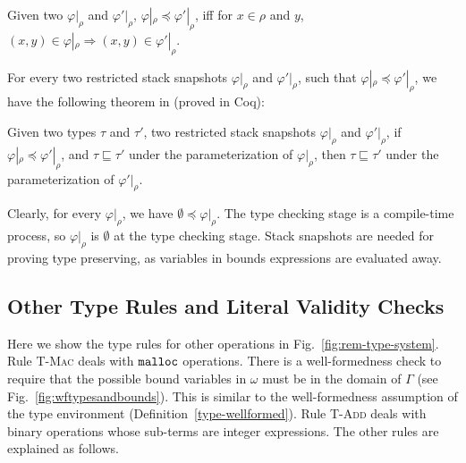 \begin{defi}
  Given two $\varphi|_{\rho}$ and $\varphi'|_{\rho}$,
  $\varphi|_{\rho} \preceq \varphi'|_{\rho}$, iff for $x\in\rho$ and
  $y$,
  $(x,y) \in \varphi|_{\rho} \Rightarrow (x,y) \in \varphi'|_{\rho}$.
\end{defi}

For every two restricted stack snapshots $\varphi|_{\rho}$ and
$\varphi'|_{\rho}$, such that
$\varphi|_{\rho} \preceq \varphi'|_{\rho}$, we have the following
theorem in \checkedc (proved in Coq):

\begin{thm}
  Given two types $\tau$ and $\tau'$, two restricted stack snapshots
  $\varphi|_{\rho}$ and $\varphi'|_{\rho}$, if
  $\varphi|_{\rho}\preceq \varphi'|_{\rho}$, and
  $\tau \sqsubseteq \tau'$ under the parameterization of
  $\varphi|_{\rho}$, then $\tau \sqsubseteq \tau'$ under the
  parameterization of $\varphi'|_{\rho}$.
\end{thm}

Clearly, for every $\varphi|_{\rho}$, we have
$\emptyset \preceq \varphi|_{\rho}$. The type checking stage is a
compile-time process, so $\varphi|_{\rho}$
is $\emptyset$ at the type checking stage. Stack snapshots are needed
for proving type preserving, as variables in bounds expressions are
evaluated away.


\subsection{Other Type Rules and Literal Validity Checks}\label{rem-type}

Here we show the type rules for other \lang operations in Fig.~\ref{fig:rem-type-system}.
Rule \textsc{T-Mac} deals with
$\mathtt{malloc}$ operations. There is a well-formedness check to require
that the possible bound variables in $\omega$ must be in the domain of
$\Gamma$ (see Fig.~\ref{fig:wftypesandbounds}). This is similar to the well-formedness assumption of the type environment (Definition~\ref{type-wellformed}). Rule \textsc{T-Add} deals with binary operations whose sub-terms are integer expressions.
The other rules are explained as follows.

